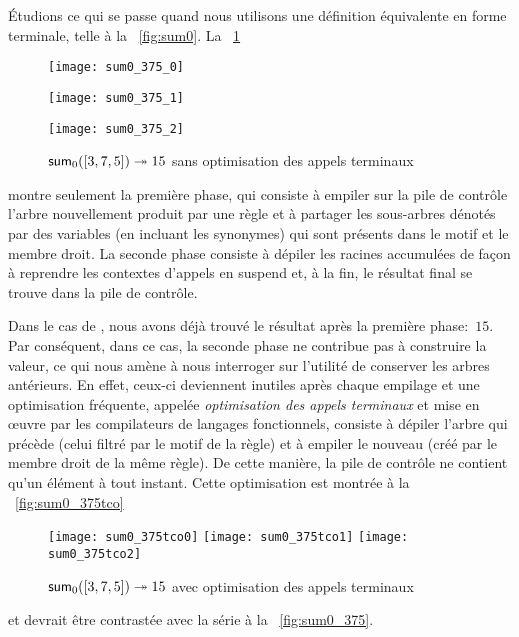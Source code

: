 Étudions ce qui se passe quand nous utilisons une définition
équivalente en forme terminale, telle  à la
\fig~\vref{fig:sum0}. La \fig~\ref{fig:sum0_375}
\begin{figure}[!t]
\centering
\texttt{[image: sum0\_375\_0]}

\texttt{[image: sum0\_375\_1]}

\texttt{[image: sum0\_375\_2]}
\caption{\(\textsf{sum}_0([3,7,5]) \twoheadrightarrow 15\)
sans optimisation des appels terminaux\label{fig:sum0_375}}
\end{figure}
montre seulement la première phase, qui consiste à empiler sur la pile
de contrôle l'arbre nouvellement produit par une règle et à partager
les sous-arbres dénotés par des variables (en incluant les synonymes)
qui sont présents dans le motif et le membre droit. La seconde phase
consiste à dépiler les racines accumulées de façon à reprendre les
contextes d'appels en suspend et, à la fin, le résultat final se
trouve dans la pile de contrôle.

Dans le cas de , nous avons déjà trouvé le résultat
après la première phase:~\(15\). Par conséquent, dans ce cas, la
seconde phase ne contribue pas à construire la valeur, ce qui nous
amène à nous interroger sur l'utilité de conserver les arbres
antérieurs. En effet, ceux-ci deviennent inutiles après chaque
empilage et une optimisation fréquente, appelée \emph{optimisation des
  appels terminaux} et mise en {\oe}uvre par les compilateurs de
langages fonctionnels, consiste à dépiler l'arbre qui précède (celui
filtré par le motif de la règle) et à empiler le nouveau (créé par le
membre droit de la même règle). De cette manière, la pile de contrôle
ne contient qu'un élément à tout instant. Cette optimisation est
montrée à la \fig~\vref{fig:sum0_375tco}
\begin{figure}[!t]
\centering
\texttt{[image: sum0\_375tco0]}
\texttt{[image: sum0\_375tco1]}
\texttt{[image: sum0\_375tco2]}
\caption{\(\textsf{sum}_0([3,7,5])
  \twoheadrightarrow 15\) avec optimisation des appels terminaux
  \label{fig:sum0_375tco}}
\end{figure}
et devrait être contrastée avec la série à la \fig~\vref{fig:sum0_375}.

